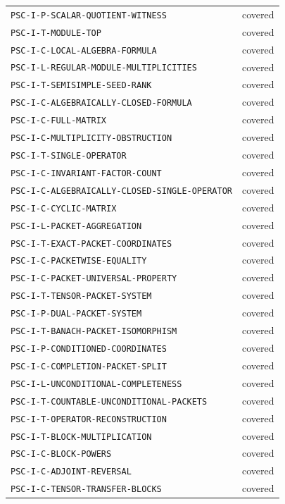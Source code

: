 {\begin{longtable}{p{}p{}}
\nolinkurl{PSC-I-P-SCALAR-QUOTIENT-WITNESS} & covered \\
\nolinkurl{PSC-I-T-MODULE-TOP} & covered \\
\nolinkurl{PSC-I-C-LOCAL-ALGEBRA-FORMULA} & covered \\
\nolinkurl{PSC-I-L-REGULAR-MODULE-MULTIPLICITIES} & covered \\
\nolinkurl{PSC-I-T-SEMISIMPLE-SEED-RANK} & covered \\
\nolinkurl{PSC-I-C-ALGEBRAICALLY-CLOSED-FORMULA} & covered \\
\nolinkurl{PSC-I-C-FULL-MATRIX} & covered \\
\nolinkurl{PSC-I-C-MULTIPLICITY-OBSTRUCTION} & covered \\
\nolinkurl{PSC-I-T-SINGLE-OPERATOR} & covered \\
\nolinkurl{PSC-I-C-INVARIANT-FACTOR-COUNT} & covered \\
\nolinkurl{PSC-I-C-ALGEBRAICALLY-CLOSED-SINGLE-OPERATOR} & covered \\
\nolinkurl{PSC-I-C-CYCLIC-MATRIX} & covered \\
\nolinkurl{PSC-I-L-PACKET-AGGREGATION} & covered \\
\nolinkurl{PSC-I-T-EXACT-PACKET-COORDINATES} & covered \\
\nolinkurl{PSC-I-C-PACKETWISE-EQUALITY} & covered \\
\nolinkurl{PSC-I-C-PACKET-UNIVERSAL-PROPERTY} & covered \\
\nolinkurl{PSC-I-T-TENSOR-PACKET-SYSTEM} & covered \\
\nolinkurl{PSC-I-P-DUAL-PACKET-SYSTEM} & covered \\
\nolinkurl{PSC-I-T-BANACH-PACKET-ISOMORPHISM} & covered \\
\nolinkurl{PSC-I-P-CONDITIONED-COORDINATES} & covered \\
\nolinkurl{PSC-I-C-COMPLETION-PACKET-SPLIT} & covered \\
\nolinkurl{PSC-I-L-UNCONDITIONAL-COMPLETENESS} & covered \\
\nolinkurl{PSC-I-T-COUNTABLE-UNCONDITIONAL-PACKETS} & covered \\
\nolinkurl{PSC-I-T-OPERATOR-RECONSTRUCTION} & covered \\
\nolinkurl{PSC-I-T-BLOCK-MULTIPLICATION} & covered \\
\nolinkurl{PSC-I-C-BLOCK-POWERS} & covered \\
\nolinkurl{PSC-I-C-ADJOINT-REVERSAL} & covered \\
\nolinkurl{PSC-I-C-TENSOR-TRANSFER-BLOCKS} & covered \\

\end{longtable}}
